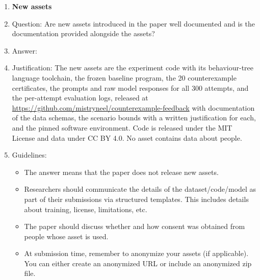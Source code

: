 \begin{enumerate}
\begin{itemize}
        \item The name of the license (e.g., CC-BY 4.0) should be included for each asset.
        \item For scraped data from a particular source (e.g., website), the copyright and terms of service of that source should be provided.
        \item If assets are released, the license, copyright information, and terms of use in the package should be provided. For popular datasets, \url{paperswithcode.com/datasets} has curated licenses for some datasets. Their licensing guide can help determine the license of a dataset.
        \item For existing datasets that are re-packaged, both the original license and the license of the derived asset (if it has changed) should be provided.
        \item If this information is not available online, the authors are encouraged to reach out to the asset's creators.
    \end{itemize}

\item {\bf New assets}
    \item[] Question: Are new assets introduced in the paper well documented and is the documentation provided alongside the assets?
    \item[] Answer: \answerYes{}
    \item[] Justification: The new assets are the experiment code with its behaviour-tree language toolchain, the frozen baseline program, the 20 counterexample certificates, the prompts and raw model responses for all 300 attempts, and the per-attempt evaluation logs, released at \url{https://github.com/mistryneel/counterexample-feedback}
    with documentation of the data schemas, the scenario bounds with a written justification for each, and the pinned software environment. Code is released under the MIT License and data under CC BY 4.0. No asset contains data about people.
    \item[] Guidelines:
    \begin{itemize}
        \item The answer \answerNA{} means that the paper does not release new assets.
        \item Researchers should communicate the details of the dataset/code/model as part of their submissions via structured templates. This includes details about training, license, limitations, etc.
        \item The paper should discuss whether and how consent was obtained from people whose asset is used.
        \item At submission time, remember to anonymize your assets (if applicable). You can either create an anonymized URL or include an anonymized zip file.
    \end{itemize}


\end{enumerate}
